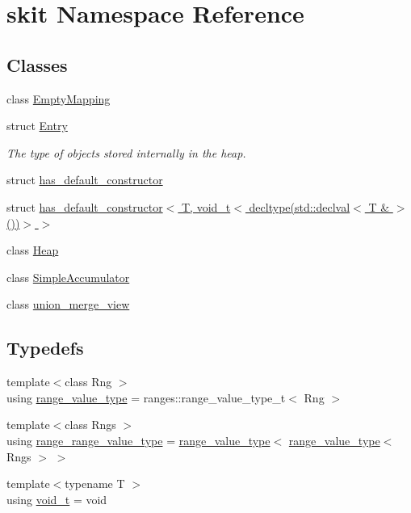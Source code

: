 \hypertarget{namespaceskit}{}\section{skit Namespace Reference}
\label{namespaceskit}
\subsection*{Classes}
\begin{DoxyCompactItemize}
\item 
class \hyperlink{classskit_1_1EmptyMapping}{Empty\+Mapping}
\item 
struct \hyperlink{structskit_1_1Entry}{Entry}
\begin{DoxyCompactList}\small\item\em The type of objects stored internally in the heap. \end{DoxyCompactList}\item 
struct \hyperlink{structskit_1_1has__default__constructor}{has\+\_\+default\+\_\+constructor}
\item 
struct \hyperlink{structskit_1_1has__default__constructor_3_01T_00_01void__t_3_01decltype_07std_1_1declval_3_01T_01_6_01_4_07_08_08_4_01_4}{has\+\_\+default\+\_\+constructor$<$ T, void\+\_\+t$<$ decltype(std\+::declval$<$ T \& $>$())$>$ $>$}
\item 
class \hyperlink{classskit_1_1Heap}{Heap}
\item 
class \hyperlink{classskit_1_1SimpleAccumulator}{Simple\+Accumulator}
\item 
class \hyperlink{classskit_1_1union__merge__view}{union\+\_\+merge\+\_\+view}
\end{DoxyCompactItemize}
\subsection*{Typedefs}
\begin{DoxyCompactItemize}
\item 
{\footnotesize template$<$class Rng $>$ }\\using \hyperlink{namespaceskit_ab6185faee3b25c70e0b355c7ce30a8ed}{range\+\_\+value\+\_\+type} = ranges\+::range\+\_\+value\+\_\+type\+\_\+t$<$ Rng $>$
\item 
{\footnotesize template$<$class Rngs $>$ }\\using \hyperlink{namespaceskit_a018f1a68fe40fa3792a5038ef842e116}{range\+\_\+range\+\_\+value\+\_\+type} = \hyperlink{namespaceskit_ab6185faee3b25c70e0b355c7ce30a8ed}{range\+\_\+value\+\_\+type}$<$ \hyperlink{namespaceskit_ab6185faee3b25c70e0b355c7ce30a8ed}{range\+\_\+value\+\_\+type}$<$ Rngs $>$ $>$
\item 
{\footnotesize template$<$typename T $>$ }\\using \hyperlink{namespaceskit_a827cfc47784c1ce9cc3e7c583ac3b1cb}{void\+\_\+t} = void
\end{DoxyCompactItemize}
